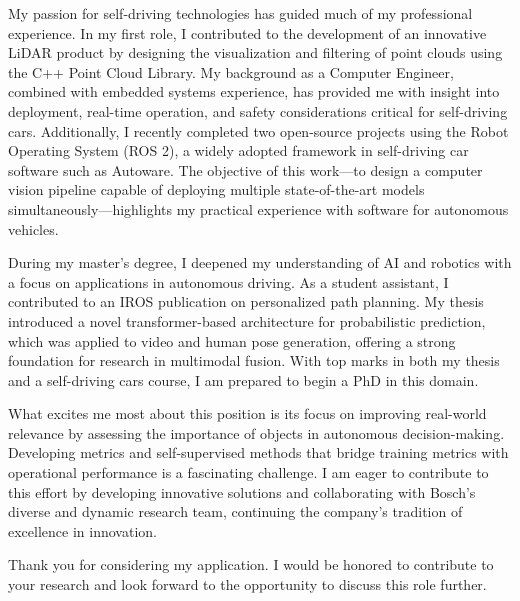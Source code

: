 \documentclass[11pt,a4paper,skipsamekey]{moderncv}
\begin{document}
My passion for self-driving technologies has guided much of my professional experience.  
In my first role, I contributed to the development of an innovative LiDAR product by designing the visualization and filtering of point clouds using the C++ Point Cloud Library.  
My background as a Computer Engineer, combined with embedded systems experience, has provided me with insight into deployment, real-time operation, and safety considerations critical for self-driving cars. 
Additionally, I recently completed two open-source projects using the Robot Operating System (ROS 2), a widely adopted framework in self-driving car software such as Autoware. 
The objective of this work—to design a computer vision pipeline capable of deploying multiple state-of-the-art models simultaneously—highlights my practical experience with software for autonomous vehicles.

During my master’s degree, I deepened my understanding of AI and robotics with a focus on applications in autonomous driving.
As a student assistant, I contributed to an IROS publication on personalized path planning.
My thesis introduced a novel transformer-based architecture for probabilistic prediction, which was applied to video and human pose generation, offering a strong foundation for research in multimodal fusion. 
With top marks in both my thesis and a self-driving cars course, I am prepared to begin a PhD in this domain.


What excites me most about this position is its focus on improving real-world relevance by assessing the importance of objects in autonomous decision-making.  
Developing metrics and self-supervised methods that bridge training metrics with operational performance is a fascinating challenge.  
I am eager to contribute to this effort by developing innovative solutions and collaborating with Bosch’s diverse and dynamic research team, continuing the company’s tradition of excellence in innovation.

Thank you for considering my application. I would be honored to contribute to your research and look forward to the opportunity to discuss this role further.


	\vspace{0.5cm}
\makeletterclosing
\end{document}
